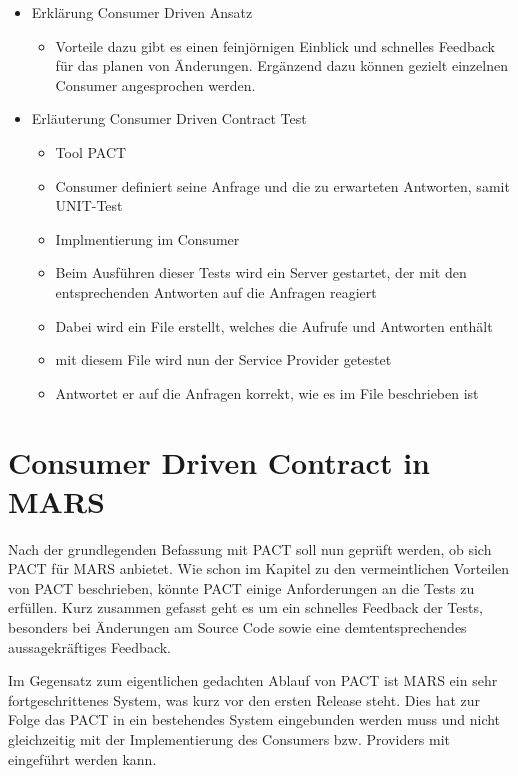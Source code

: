 \documentclass{llncs}
\begin{document}
\begin{itemize}
\item Erklärung Consumer Driven Ansatz
\begin{itemize}

\item Vorteile dazu gibt es einen feinjörnigen Einblick und schnelles Feedback für das planen von Änderungen. Ergänzend dazu können gezielt einzelnen Consumer angesprochen werden.
\end{itemize}
\item Erläuterung Consumer Driven Contract Test
\begin{itemize}
\item Tool PACT
\item Consumer definiert seine Anfrage und die zu erwarteten Antworten, samit UNIT-Test
\item Implmentierung im Consumer
\item Beim Ausführen dieser Tests wird ein Server gestartet, der mit den entsprechenden Antworten auf die Anfragen reagiert
\item Dabei wird ein File erstellt, welches die Aufrufe und Antworten enthält
\item mit diesem File wird nun der Service Provider getestet
\item Antwortet er auf die Anfragen korrekt, wie es im File beschrieben ist

\end{itemize}
\end{itemize}


\section{Consumer Driven Contract in MARS}
Nach der grundlegenden Befassung mit PACT soll nun geprüft werden, ob sich PACT für MARS anbietet. Wie schon im Kapitel zu den vermeintlichen Vorteilen von PACT beschrieben, könnte PACT einige Anforderungen an die Tests zu erfüllen. Kurz zusammen gefasst geht es um ein schnelles Feedback der Tests, besonders bei Änderungen am Source Code sowie eine demtentsprechendes aussagekräftiges Feedback.

Im Gegensatz zum eigentlichen gedachten Ablauf von PACT ist MARS ein sehr fortgeschrittenes System, was kurz vor den ersten Release steht. Dies hat zur Folge das PACT in ein bestehendes System eingebunden werden muss und nicht gleichzeitig mit der Implementierung des Consumers bzw. Providers mit eingeführt werden kann.
\end{document}
